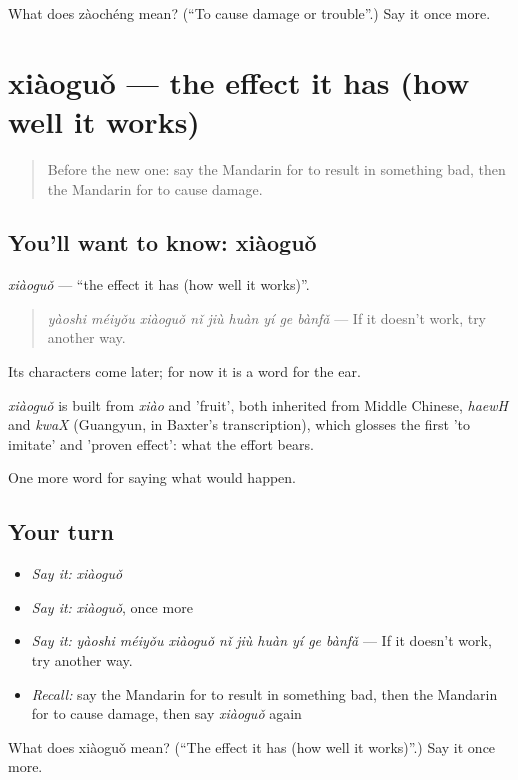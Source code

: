 \begin{tcolorbox}[breakable,colback=teal!4,colframe=teal!35!black,title={Before you move on}]
What does zàochéng mean? (\textquotedblleft{}To cause damage or trouble\textquotedblright{}.) Say it once more.
\end{tcolorbox}
\section[xiàoguǒ]{xiàoguǒ — the effect it has (how well it works)}

\label{lesson:ZH-C537-xiaoguo}



\begin{quote}
Before the new one: say the Mandarin for to result in something bad, then the Mandarin for to cause damage.
\end{quote}

\subsection*{You'll want to know: xiàoguǒ}
\emph{xiàoguǒ} — \textquotedblleft{}the effect it has (how well it works)\textquotedblright{}.

\begin{quote}
\emph{yàoshi méiyǒu xiàoguǒ nǐ jiù huàn yí ge bànfǎ} — If it doesn't work, try another way.
\end{quote}

Its characters come later; for now it is a word for the ear.

\begin{cousinweb}
\emph{xiàoguǒ} is built from \emph{xiào} and  'fruit', both inherited from Middle Chinese, \emph{haewH} and \emph{kwaX} (Guangyun, in Baxter's transcription), which glosses the first 'to imitate' and 'proven effect': what the effort bears.
\end{cousinweb}

\begin{grammarlens}[title={What you've built}]
One more word for saying what would happen.
\end{grammarlens}

\subsection*{Your turn}
\begin{itemize}
\raggedright
  \item \emph{Say it:} \emph{xiàoguǒ}
  \item \emph{Say it:} \emph{xiàoguǒ}, once more
  \item \emph{Say it:} \emph{yàoshi méiyǒu xiàoguǒ nǐ jiù huàn yí ge bànfǎ} — If it doesn't work, try another way.
  \item \emph{Recall:} say the Mandarin for to result in something bad, then the Mandarin for to cause damage, then say \emph{xiàoguǒ} again
\end{itemize}

\begin{tcolorbox}[breakable,colback=teal!4,colframe=teal!35!black,title={Before you move on}]
What does xiàoguǒ mean? (\textquotedblleft{}The effect it has (how well it works)\textquotedblright{}.) Say it once more.
\end{tcolorbox}
